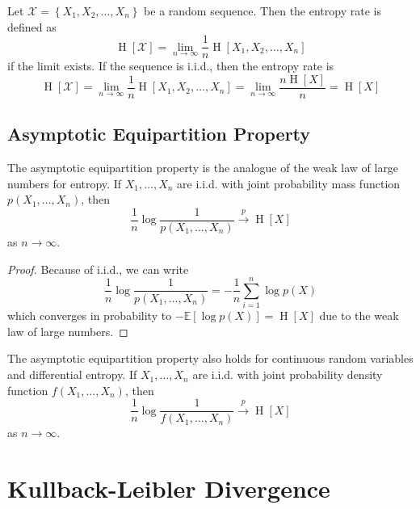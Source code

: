 \documentclass[11pt]{report} %
\begin{document}
Let $\mathcal{X} = \left\{X_{1}, X_{2}, \dots, X_{n}\right\}$ be a random sequence. Then the entropy rate is defined as
\begin{equation}
\operatorname{H}\left[\mathcal{X}\right] = \lim_{n\to\infty}\dfrac{1}{n}\operatorname{H}\left[X_{1}, X_{2}, \dots, X_{n}\right]
\end{equation}
if the limit exists. If the sequence is i.i.d., then the entropy rate is
\begin{equation}
\operatorname{H}\left[\mathcal{X}\right] = \lim_{n\to\infty}\dfrac{1}{n}\operatorname{H}\left[X_{1}, X_{2}, \dots, X_{n}\right] = \lim_{n\to\infty}\dfrac{n\operatorname{H}\left[X\right]}{n} = \operatorname{H}\left[X\right]
\end{equation}

\subsection{Asymptotic Equipartition Property}

The asymptotic equipartition property is the analogue of the weak law of large numbers for entropy. If $X_{1}, \dots, X_{n}$ are i.i.d. with joint probability mass function $p\left(X_{1}, \dots, X_{n}\right)$, then
\begin{equation}
\dfrac{1}{n}\log\dfrac{1}{p\left(X_{1}, \dots, X_{n}\right)} \overset{p}{\to} \operatorname{H}\left[X\right]
\end{equation}
as $n\to\infty$.
\begin{proof}
Because of i.i.d., we can write
\begin{equation}
\dfrac{1}{n}\log\dfrac{1}{p\left(X_{1}, \dots, X_{n}\right)} = -\dfrac{1}{n}\sum_{i = 1}^{n}\log p\left(X\right)
\end{equation}
which converges in probability to $-\mathbb{E}\left[\log p\left(X\right)\right] = \operatorname{H}\left[X\right]$ due to the weak law of large numbers.
\end{proof}
The asymptotic equipartition property also holds for continuous random variables and differential entropy. If $X_{1}, \dots, X_{n}$ are i.i.d. with joint probability density function $f\left(X_{1}, \dots, X_{n}\right)$, then
\begin{equation}
\dfrac{1}{n}\log\dfrac{1}{f\left(X_{1}, \dots, X_{n}\right)} \overset{p}{\to} \operatorname{H}\left[X\right]
\end{equation}
as $n\to\infty$.

\section{Kullback-Leibler Divergence}
\end{document}
